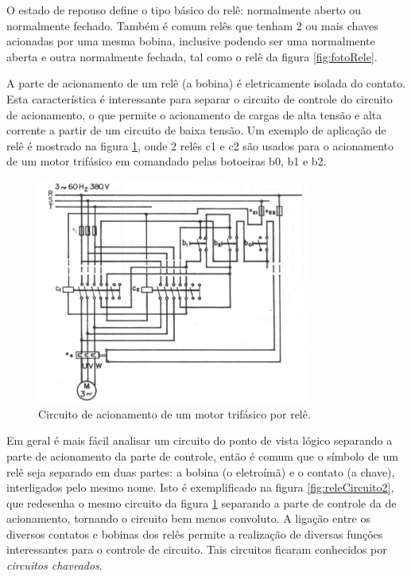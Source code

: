 O estado de repouso define o tipo básico do relê: normalmente aberto ou normalmente fechado. Também é comum relês que tenham 2 ou mais chaves acionadas por uma mesma bobina, inclusive podendo ser uma normalmente aberta e outra normalmente fechada, tal como o relê da figura \ref{fig:fotoRele}.

A parte de acionamento de um relê (a bobina) é eletricamente isolada do contato. Esta característica é interessante para separar o circuito de controle do circuito de acionamento, o que permite o acionamento de cargas de alta tensão e alta corrente a partir de um circuito de baixa tensão. Um exemplo de aplicação de relê é mostrado na figura \ref{fig:releCircuito1}, onde 2 relês c1 e c2 são usados para o acionamento de um motor trifásico em comandado pelas botoeiras b0, b1 e b2.

\begin{figure}[hbt]
  \begin{center}
    \includegraphics[width=0.8\textwidth]{figuras/releCircuito1} %
  \end{center}
  \caption{Circuito de acionamento de um motor trifásico por relê.}
  \label{fig:releCircuito1}
\end{figure}

Em geral é mais fácil analisar um circuito do ponto de vista lógico separando a parte de acionamento da parte de controle, então é comum que o símbolo de um relê seja separado em duas partes: a bobina (o eletroímã) e o contato (a chave), interligados pelo mesmo nome. Isto é exemplificado na figura \ref{fig:releCircuito2}, que redesenha o mesmo circuito da figura \ref{fig:releCircuito1} separando a parte de controle da de acionamento, tornando o circuito bem menos convoluto. A ligação entre os diversos contatos e bobinas dos relês permite a realização de diversas funções interessantes para o controle de circuito. Tais circuitos ficaram conhecidos por \emph{circuitos chaveados}.

